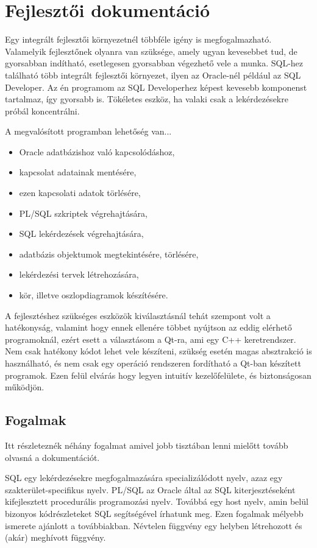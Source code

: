 \chapter{Fejlesztői dokumentáció}

Egy integrált fejlesztői környezetnél többféle igény is megfogalmazható. Valamelyik fejlesztőnek
olyanra van szüksége, amely ugyan kevesebbet tud, de gyorsabban indítható, esetlegesen gyorsabban
végezhető vele a munka. SQL-hez található több integrált fejlesztői környezet, ilyen az Oracle-nél
például az SQL Developer\cite{sqldeveloper}.
Az én programom az SQL Developerhez képest kevesebb komponenst tartalmaz, így gyorsabb is. Tökéletes
eszköz, ha valaki csak a lekérdezésekre próbál koncentrálni.

A megvalósított programban lehetőség van...
\begin{itemize}
  \item Oracle adatbázishoz való kapcsolódáshoz,
  \item kapcsolat adatainak mentésére,
  \item ezen kapcsolati adatok törlésére,
  \item PL/SQL szkriptek végrehajtására,
  \item SQL lekérdezések végrehajtására,
  \item adatbázis objektumok megtekintésére, törlésére,
  \item lekérdezési tervek létrehozására,
  \item kör, illetve oszlopdiagramok készítésére.
\end{itemize}

A fejlesztéshez szükséges eszközök kiválasztásnál tehát szempont volt a hatékonyság, valamint hogy
ennek ellenére többet nyújtson az eddig elérhető programoknál, ezért esett a választásom a Qt-ra, ami egy C++ keretrendszer.
Nem csak hatékony kódot lehet vele készíteni, szükség esetén magas absztrakció is használható, és nem
csak egy operáció rendszeren fordítható a Qt-ban készített programok. Ezen felül elvárás hogy legyen intuitív kezelőfelülete,
és biztonságosan működjön.

\section{Fogalmak}
Itt részleteznék néhány fogalmat amivel jobb tisztában lenni mielőtt tovább olvasná a dokumentációt.

SQL egy lekérdezésekre megfogalmazására specializálódott nyelv, azaz egy szakterület-specifikus nyelv.
PL/SQL az Oracle által az SQL kiterjesztéseként kifejlesztett procedurális programozási nyelv. Továbbá egy host nyelv,
amin belül bizonyos kódrészleteket SQL segítségével írhatunk meg. Ezen fogalmak mélyebb ismerete ajánlott a továbbiakban.
Névtelen függvény egy helyben létrehozott és (akár) meghívott függvény.

